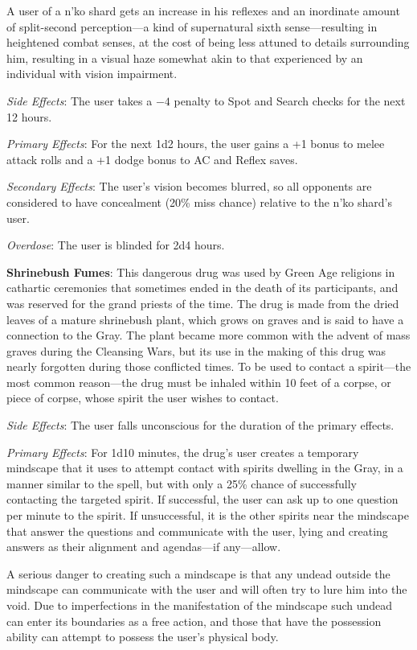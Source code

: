 A user of a n'ko shard gets an increase in his reflexes and an inordinate amount of split-second perception---a kind of supernatural sixth sense---resulting in heightened combat senses, at the cost of being less attuned to details surrounding him, resulting in a visual haze somewhat akin to that experienced by an individual with vision impairment.

\textit{Side Effects}: The user takes a $-4$ penalty to Spot and Search checks for the next 12 hours.

\textit{Primary Effects}: For the next 1d2 hours, the user gains a +1 bonus to melee attack rolls and a +1 dodge bonus to AC and Reflex saves.

\textit{Secondary Effects}: The user's vision becomes blurred, so all opponents are considered to have concealment (20\% miss chance) relative to the n'ko shard's user.

\textit{Overdose}: The user is blinded for 2d4 hours.

\textbf{Shrinebush Fumes}: This dangerous drug was used by Green Age religions in cathartic ceremonies that sometimes ended in the death of its participants, and was reserved for the grand priests of the time. The drug is made from the dried leaves of a mature shrinebush plant, which grows on graves and is said to have a connection to the Gray. The plant became more common with the advent of mass graves during the Cleansing Wars, but its use in the making of this drug was nearly forgotten during those conflicted times. To be used to contact a spirit---the most common reason---the drug must be inhaled within 10 feet of a corpse, or piece of corpse, whose spirit the user wishes to contact.

\textit{Side Effects}: The user falls unconscious for the duration of the primary effects.

\textit{Primary Effects}: For 1d10 minutes, the drug's user creates a temporary mindscape that it uses to attempt contact with spirits dwelling in the Gray, in a manner similar to the  spell, but with only a 25\% chance of successfully contacting the targeted spirit. If successful, the user can ask up to one question per minute to the spirit. If unsuccessful, it is the other spirits near the mindscape that answer the questions and communicate with the user, lying and creating answers as their alignment and agendas---if any---allow.

A serious danger to creating such a mindscape is that any undead outside the mindscape can communicate with the user and will often try to lure him into the void. Due to imperfections in the manifestation of the mindscape such undead can enter its boundaries as a free action, and those that have the possession ability can attempt to possess the user's physical body.

